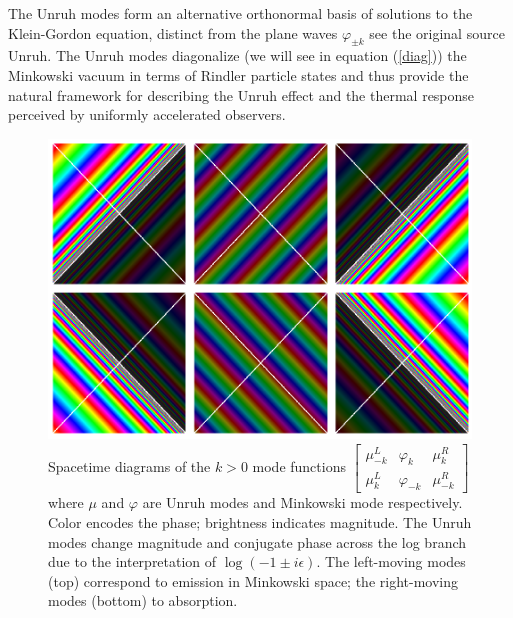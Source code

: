\documentclass[12pt,a4paper]{article}
\begin{document}
The Unruh modes form an alternative orthonormal basis of solutions to the Klein-Gordon equation, distinct from the plane waves $\varphi_{\pm k}$ see the original source Unruh\cite{unruh1976notes}. The Unruh modes diagonalize (we will see in equation (\ref{diag})) the Minkowski vacuum in terms of Rindler particle states and thus provide the natural framework for describing the Unruh effect and the thermal response perceived by uniformly accelerated observers.

\begin{figure}[h]
\centering
\includegraphics[scale=0.3]{unruh_mode_rainbow.png}
\captionsetup{width=0.7\textwidth}
\caption{Spacetime diagrams of the $k>0$ mode functions $\left[\begin{array}{ccc} \mu^L_{-k} & \varphi_k & \mu^R_k \\ \mu^L_{k} & \varphi_{-k} & \mu^R_{-k} \end{array} \right]$ where $\mu$ and $\varphi$ are Unruh modes and Minkowski mode respectively. Color encodes the phase; brightness indicates magnitude. The Unruh modes change magnitude and conjugate phase across the log branch due to the interpretation of $\log(-1 \pm i\epsilon)$. The left-moving modes (top) correspond to emission in Minkowski space; the right-moving modes (bottom) to absorption.}
\label{unruh_rainbow}
\end{figure}
\end{document}
